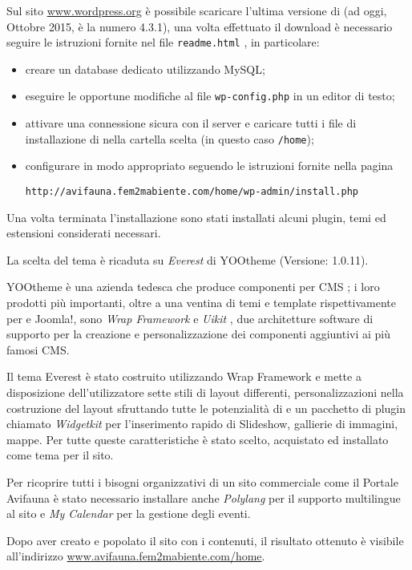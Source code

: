 Sul sito \url{www.wordpress.org} è possibile scaricare l'ultima versione di {\wp} (ad oggi, Ottobre 2015, è la numero 4.3.1), una volta effettuato il download è necessario seguire le istruzioni fornite nel file \texttt{readme.html} \cite{installing_wordpress}, in particolare:
\begin{itemize}
 \item creare un database dedicato utilizzando MySQL;
 \item eseguire le opportune modifiche al file \texttt{wp-config.php} in un editor di testo;
 \item attivare una connessione sicura con il server e caricare tutti i file di installazione di {\wp} nella cartella scelta (in questo caso \texttt{/home});
 \item configurare in modo appropriato seguendo le istruzioni fornite nella pagina

 \texttt{http://avifauna.fem2mabiente.com/home/wp-admin/install.php}
\end{itemize}

Una volta terminata l'installazione sono stati installati alcuni plugin, temi ed estensioni considerati necessari.

La scelta del tema è ricaduta su \emph{Everest} di YOOtheme (Versione: 1.0.11). 

YOOtheme è una azienda tedesca che produce componenti per CMS \cite{yootheme}; i loro prodotti più importanti, oltre a una ventina di temi e template rispettivamente per {\wp} e Joomla!, sono \emph{Wrap Framework} \cite{wrap} e \emph{Uikit} \cite{uikit}, due architetture software di supporto per la creazione e personalizzazione dei componenti aggiuntivi ai più famosi CMS.

Il tema Everest è stato costruito utilizzando Wrap Framework e mette a disposizione dell'utilizzatore sette stili di layout differenti, personalizzazioni nella costruzione del layout sfruttando tutte le potenzialità di {\wp} e un pacchetto di plugin chiamato \emph{Widgetkit} per l'inserimento rapido di Slideshow, gallierie di immagini, mappe. Per tutte queste caratteristiche è stato scelto, acquistato ed installato come tema per il sito.

Per ricoprire tutti i bisogni organizzativi di un sito commerciale come il Portale Avifauna è stato necessario installare anche \emph{Polylang} \cite{polylang} per il supporto multilingue al sito e \emph{My Calendar} \cite{mycalendar} per la gestione degli eventi.

Dopo aver creato e popolato il sito con i contenuti, il risultato ottenuto è visibile all'indirizzo \url{www.avifauna.fem2mabiente.com/home}.
